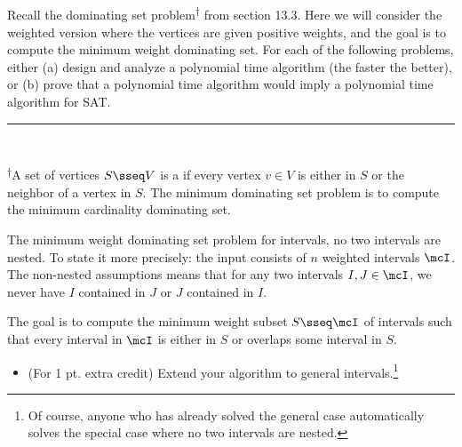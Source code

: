 \documentclass{article}
\begin{document}
\setcounter{section}{13}
\setcounter{exercise}{6}
 Recall the dominating set problem\textsuperscript{\hyperref[fn:dmset]{$\dagger$}} from section 13.3.
  Here we will consider the weighted version where the vertices are given positive weights, and the goal is to compute the minimum weight dominating set.
  For each of the following problems, either (a) design and analyze a polynomial time algorithm (the faster the better), or (b) prove that a polynomial time algorithm would imply a polynomial time algorithm for SAT. \\
\noindent\rule{2in}{0.4pt} \\
\parbox{\linewidth}{\small \textsuperscript{\label{fn:dmset}$\dagger$}A set of vertices $S \sseq V$ is a  if every vertex $v \in V$ is either in $S$ or the neighbor of a vertex in $S$.
  The minimum dominating set problem is to compute the minimum cardinality dominating set.}

\begin{subexercise}
  The minimum weight dominating set problem for intervals,  no two intervals are nested.
  To state it more precisely: the input consists of $ n $ weighted intervals $ \mcI $.
  The non-nested assumptions means that for any two intervals $ I, J \in \mcI $, we never have $ I $ contained in $ J $ or $ J $ contained in $ I $.

  The goal is to compute the minimum weight subset $ S \sseq \mcI $ of intervals such that every interval in $ \mcI $ is either in $ S $ or overlaps some interval in $ S $.
\begin{itemize}
  \item (For 1 pt. extra credit) Extend your algorithm to general intervals.\footnote[8]{Of course, anyone who has already solved the general case automatically solves the special case where no two intervals are nested.}
\end{itemize}
\end{subexercise}
\end{document}
